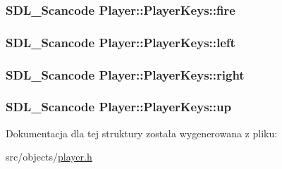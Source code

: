 \subsubsection[{fire}]{\setlength{\rightskip}{0pt plus 5cm}S\+D\+L\+\_\+\+Scancode Player\+::\+Player\+Keys\+::fire}\label{struct_player_1_1_player_keys_ae9a752c12df2b347234bb7acefe93ed0}
\hypertarget{struct_player_1_1_player_keys_a963bc2b65a3e864cb863a0ed5d77a233}{}
\subsubsection[{left}]{\setlength{\rightskip}{0pt plus 5cm}S\+D\+L\+\_\+\+Scancode Player\+::\+Player\+Keys\+::left}\label{struct_player_1_1_player_keys_a963bc2b65a3e864cb863a0ed5d77a233}
\hypertarget{struct_player_1_1_player_keys_a0ed2777f9a657033b9ceb04302fea7c5}{}
\subsubsection[{right}]{\setlength{\rightskip}{0pt plus 5cm}S\+D\+L\+\_\+\+Scancode Player\+::\+Player\+Keys\+::right}\label{struct_player_1_1_player_keys_a0ed2777f9a657033b9ceb04302fea7c5}
\hypertarget{struct_player_1_1_player_keys_a943bcfbd15d886d3d2a397343717dd4f}{}
\subsubsection[{up}]{\setlength{\rightskip}{0pt plus 5cm}S\+D\+L\+\_\+\+Scancode Player\+::\+Player\+Keys\+::up}\label{struct_player_1_1_player_keys_a943bcfbd15d886d3d2a397343717dd4f}


Dokumentacja dla tej struktury została wygenerowana z pliku\+:\begin{DoxyCompactItemize}
\item 
src/objects/\hyperlink{player_8h}{player.\+h}\end{DoxyCompactItemize}
